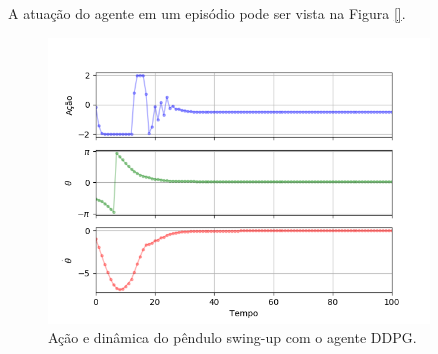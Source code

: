 A atuação do agente em um episódio pode ser vista na Figura \ref{}. 

\begin{figure}[H]
	\centering
	\includegraphics[width=0.9\textwidth]{02_desenvolvimento/04_EC_Fig_PendulumDDPGVarGraf.png}
	\caption{Ação e dinâmica do pêndulo swing-up com o agente DDPG.}
	\label{fig:4ec-pendulum}
\end{figure}














